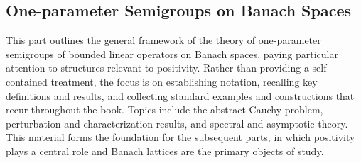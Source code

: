 \begin{partbacktext}
\part[One-parameter Semigroups on Banach Spaces]{One-parameter Semigroups on Banach Spaces }
This part outlines the general framework of the theory of one-parameter semigroups of bounded linear operators on Banach spaces, paying particular attention to structures relevant to positivity.
Rather than providing a self-contained treatment, the focus is on establishing notation, recalling key definitions and results, and collecting standard examples and constructions that recur throughout the book.
Topics include the abstract Cauchy problem, perturbation and characterization results, and spectral and asymptotic theory.
This material forms the foundation for the subsequent parts, in which positivity plays a central role and Banach lattices are the primary objects of study.
\end{partbacktext}

